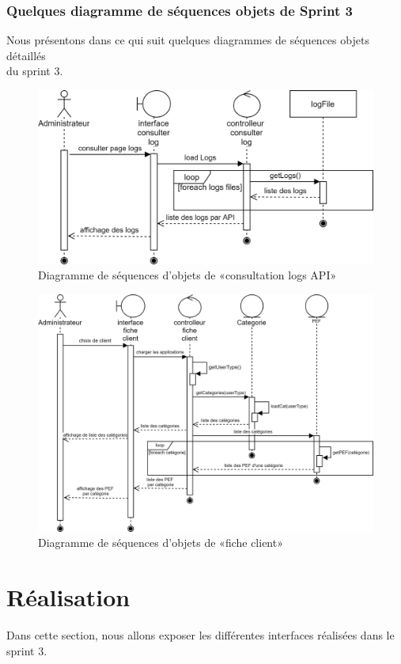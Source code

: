 \subsubsection{Quelques diagramme de séquences objets de Sprint 3}
Nous présentons dans ce qui suit quelques diagrammes de séquences objets détaillés \\du sprint 3.
	\begin{figure}[H]
		\centering
		\includegraphics[width=0.7\linewidth]{"img/conception/sequences/sprint 3/log-api-obj"}
		\caption[Diagramme de séquences d’objets de «consultation logs API»]{Diagramme de séquences d’objets de «consultation logs API»}
		\label{fig:log-api-obj}
	\end{figure}
	\newpage
{} 
	\begin{figure}[H]
		\centering
		\includegraphics[width=0.7\linewidth]{"img/conception/sequences/sprint 3/fiche-client-obj"}
		\caption[Diagramme de séquences d’objets de «fiche client»]{Diagramme de séquences d’objets de «fiche client»}
		\label{fig:fiche-client-obj}
	\end{figure}

\section{Réalisation}
Dans cette section, nous allons exposer les différentes interfaces réalisées dans le sprint 3.
